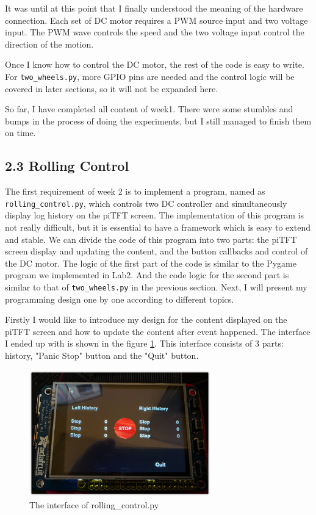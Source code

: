\documentclass[12pt]{report}
\newcommand{\code}[1]{\colorbox{light-gray}{\texttt{#1}}}
\begin{document}
It was until at this point that I finally understood the meaning of the hardware connection. Each set of DC motor requires a PWM source input and two voltage input. The PWM wave controls the speed and the two voltage input control the direction of the motion.\par
Once I know how to control the DC motor, the rest of the code is easy to write. For \code{two\_wheels.py}, more GPIO pins are needed and the control logic will be covered in later sections, so it will not be expanded here.\par
So far, I have completed all content of week1. There were some stumbles and bumps in the process of doing the experiments, but I still managed to finish them on time.\vspace{-1em}
\subsection*{2.3 Rolling Control}\vspace{-1em}
The first requirement of week 2 is to implement a program, named as \code{rolling\_control.py}, which controls two DC controller and simultaneously display log history on the piTFT screen. The implementation of this program is not really difficult, but it is essential to have a framework which is easy to extend and stable. We can divide the code of this program into two parts: the piTFT screen display and updating the content, and the button callbacks and control of the DC motor. The logic of the first part of the code is similar to the Pygame program we implemented in Lab2. And the code logic for the second part is similar to that of \code{two\_wheels.py} in the previous section. Next, I will present my programming design one by one according to different topics.\par
Firstly I would like to introduce my design for the content displayed on the piTFT screen and how to update the content after event happened. The interface I ended up with is shown in the figure \ref{fig:fig4}. This interface consists of 3 parts: history, "Panic Stop" button and the "Quit" button. 
\begin{figure}[H]
    \centering
    \includegraphics[width=0.7\textwidth]{img/RollingControl.png}
    \caption{The interface of rolling\_control.py}
    \label{fig:fig4}
\end{figure}\vspace{-2em}
\end{document}
